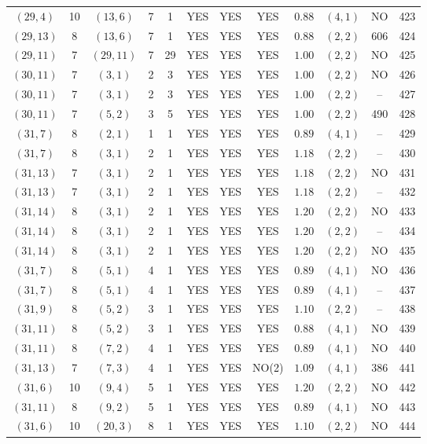 \begin{longtable}{|c|c|c|c|c|c|c|c|c|c|c|c|}
$(29,4)$ & 10 & $(13,6)$ & 7 & 1 & YES & YES & YES & $0.88$ & $(4,1)$ & NO & 423\\
$(29,13)$ & 8 & $(13,6)$ & 7 & 1 & YES & YES & YES & $0.88$ & $(2,2)$ & 606 & 424\\
$(29,11)$ & 7 & $(29,11)$ & 7 & 29 & YES & YES & YES & $1.00$ & $(2,2)$ & NO & 425\\
$(30,11)$ & 7 & $(3,1)$ & 2 & 3 & YES & YES & YES & $1.00$ & $(2,2)$ & NO & 426\\
$(30,11)$ & 7 & $(3,1)$ & 2 & 3 & YES & YES & YES & $1.00$ & $(2,2)$ & -- & 427\\
$(30,11)$ & 7 & $(5,2)$ & 3 & 5 & YES & YES & YES & $1.00$ & $(2,2)$ & 490 & 428\\
$(31,7)$ & 8 & $(2,1)$ & 1 & 1 & YES & YES & YES & $0.89$ & $(4,1)$ & -- & 429\\
$(31,7)$ & 8 & $(3,1)$ & 2 & 1 & YES & YES & YES & $1.18$ & $(2,2)$ & -- & 430\\
$(31,13)$ & 7 & $(3,1)$ & 2 & 1 & YES & YES & YES & $1.18$ & $(2,2)$ & NO & 431\\
$(31,13)$ & 7 & $(3,1)$ & 2 & 1 & YES & YES & YES & $1.18$ & $(2,2)$ & -- & 432\\
$(31,14)$ & 8 & $(3,1)$ & 2 & 1 & YES & YES & YES & $1.20$ & $(2,2)$ & NO & 433\\
$(31,14)$ & 8 & $(3,1)$ & 2 & 1 & YES & YES & YES & $1.20$ & $(2,2)$ & -- & 434\\
$(31,14)$ & 8 & $(3,1)$ & 2 & 1 & YES & YES & YES & $1.20$ & $(2,2)$ & NO & 435\\
$(31,7)$ & 8 & $(5,1)$ & 4 & 1 & YES & YES & YES & $0.89$ & $(4,1)$ & NO & 436\\
$(31,7)$ & 8 & $(5,1)$ & 4 & 1 & YES & YES & YES & $0.89$ & $(4,1)$ & -- & 437\\
$(31,9)$ & 8 & $(5,2)$ & 3 & 1 & YES & YES & YES & $1.10$ & $(2,2)$ & -- & 438\\
$(31,11)$ & 8 & $(5,2)$ & 3 & 1 & YES & YES & YES & $0.88$ & $(4,1)$ & NO & 439\\
$(31,11)$ & 8 & $(7,2)$ & 4 & 1 & YES & YES & YES & $0.89$ & $(4,1)$ & NO & 440\\
$(31,13)$ & 7 & $(7,3)$ & 4 & 1 & YES & YES & NO(2) & $1.09$ & $(4,1)$ & 386 & 441\\
$(31,6)$ & 10 & $(9,4)$ & 5 & 1 & YES & YES & YES & $1.20$ & $(2,2)$ & NO & 442\\
$(31,11)$ & 8 & $(9,2)$ & 5 & 1 & YES & YES & YES & $0.89$ & $(4,1)$ & NO & 443\\
$(31,6)$ & 10 & $(20,3)$ & 8 & 1 & YES & YES & YES & $1.10$ & $(2,2)$ & NO & 444\\

\end{longtable}
